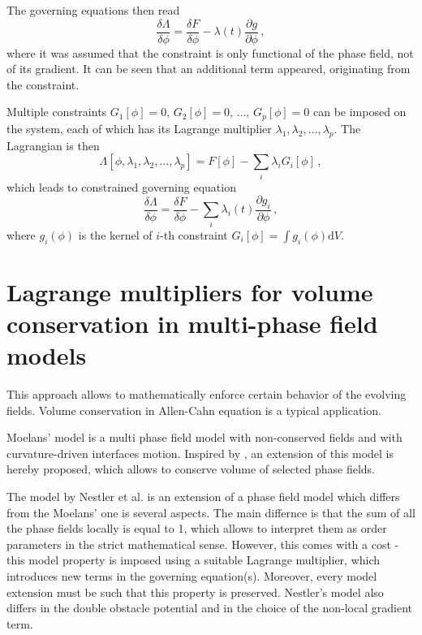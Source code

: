 The governing equations then read
\begin{equation}
\frac{\delta \Lambda}{\delta \phi} = \frac{\delta F}{\delta \phi} - \lambda(t)\frac{\partial g}{\partial \phi}\,, 
\end{equation}
where it was assumed that the constraint is only functional of the phase field, not of its gradient. It can be seen that an additional term appeared, originating from the constraint. 

Multiple constraints $G_1[\phi]=0,\,G_2[\phi]=0,\, \dots,\,G_p[\phi]=0$ can be imposed on the system, each of which has its Lagrange multiplier $\lambda_1,\lambda_2,\dots,\lambda_p$. The Lagrangian is then 
\begin{equation}
\Lambda[\phi,\lambda_1,\lambda_2,\dots,\lambda_p] = F[\phi] - \sum_i\lambda_i
G_i[\phi] \,,
\end{equation}
which leads to constrained governing equation
\begin{equation}
\frac{\delta \Lambda}{\delta \phi} = \frac{\delta F}{\delta \phi} - \sum_i\lambda_i(t)\frac{\partial g_i}{\partial \phi} \,,
\end{equation}
where $g_i(\phi)$ is the kernel of $i$-th constraint $G_i[\phi]=\int g_i(\phi)\mathrm{d}V$. 

\section{Lagrange multipliers for volume conservation in multi-phase field models}
This approach allows to mathematically enforce certain behavior of the evolving fields. Volume conservation in Allen-Cahn equation is a typical application.

Moelans' model is a multi phase field model with non-conserved fields and with curvature-driven interfaces motion. Inspired by \cite{Nestler2008}, an extension of this model is hereby proposed, which allows to conserve volume of selected phase fields.

The model by Nestler et al. \cite{Nestler2008} is an extension of a phase field model which differs from the Moelans' one is several aspects. The main differnce is that the sum of all the phase fields locally is equal to 1, which allows to interpret them as order parameters in the strict mathematical sense. However, this comes with a cost - this model property is imposed using a suitable Lagrange multiplier, which introduces new terms in the governing equation(s). Moreover, every model extension must be such that this property is preserved. Nestler's model also differs in the double obstacle potential and in the choice of the non-local gradient term.  

